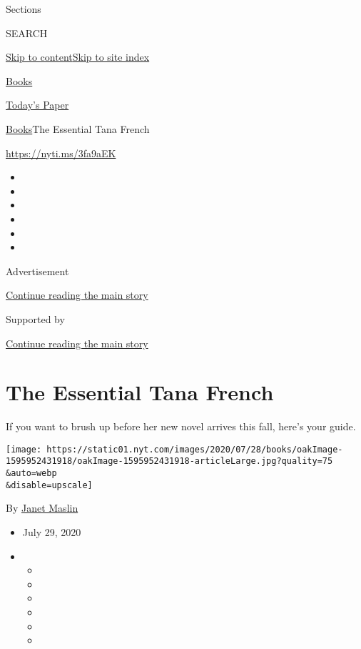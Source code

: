 Sections

SEARCH

\protect\hyperlink{site-content}{Skip to
content}\protect\hyperlink{site-index}{Skip to site index}

\href{https://www.nytimes.com/section/books}{Books}

\href{https://myaccount.nytimes.com/auth/login?response_type=cookie\&client_id=vi}{}

\href{https://www.nytimes.com/section/todayspaper}{Today's Paper}

\href{/section/books}{Books}\textbar{}The Essential Tana French

\url{https://nyti.ms/3fa9aEK}

\begin{itemize}
\item
\item
\item
\item
\item
\item
\end{itemize}

Advertisement

\protect\hyperlink{after-top}{Continue reading the main story}

Supported by

\protect\hyperlink{after-sponsor}{Continue reading the main story}

\hypertarget{the-essential-tana-french}{%
\section{The Essential Tana French}\label{the-essential-tana-french}}

If you want to brush up before her new novel arrives this fall, here's
your guide.

\texttt{[image: https://static01.nyt.com/images/2020/07/28/books/oakImage-1595952431918/oakImage-1595952431918-articleLarge.jpg?quality=75\\\&auto=webp\\\&disable=upscale]}

By \href{https://www.nytimes.com/by/janet-maslin}{Janet Maslin}

\begin{itemize}
\item
  July 29, 2020
\item
  \begin{itemize}
  \item
  \item
  \item
  \item
  \item
  \item
  \end{itemize}
\end{itemize}

